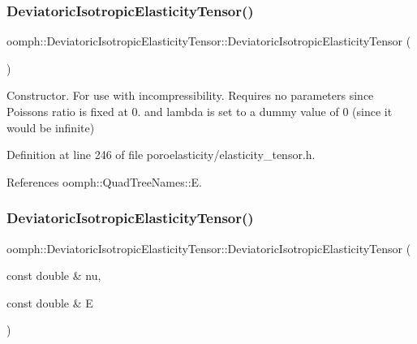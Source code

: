 \subsubsection{\texorpdfstring{Deviatoric\+Isotropic\+Elasticity\+Tensor()}{DeviatoricIsotropicElasticityTensor()}\hspace{0.1cm}{\footnotesize\ttfamily [1/4]}}
{\footnotesize\ttfamily oomph\+::\+Deviatoric\+Isotropic\+Elasticity\+Tensor\+::\+Deviatoric\+Isotropic\+Elasticity\+Tensor (\begin{DoxyParamCaption}{ }\end{DoxyParamCaption})\hspace{0.3cm}{\ttfamily [inline]}}



Constructor. For use with incompressibility. Requires no parameters since Poisson\textquotesingle{}s ratio is fixed at 0. and lambda is set to a dummy value of 0 (since it would be infinite) 



Definition at line 246 of file poroelasticity/elasticity\+\_\+tensor.\+h.



References oomph\+::\+Quad\+Tree\+Names\+::E.

\mbox{\label{classoomph_1_1DeviatoricIsotropicElasticityTensor_a4f3edce9cd91008468599fb24b950707}} 
\subsubsection{\texorpdfstring{Deviatoric\+Isotropic\+Elasticity\+Tensor()}{DeviatoricIsotropicElasticityTensor()}\hspace{0.1cm}{\footnotesize\ttfamily [2/4]}}
{\footnotesize\ttfamily oomph\+::\+Deviatoric\+Isotropic\+Elasticity\+Tensor\+::\+Deviatoric\+Isotropic\+Elasticity\+Tensor (\begin{DoxyParamCaption}\item[{const double \&}]{nu,  }\item[{const double \&}]{E }\end{DoxyParamCaption})\hspace{0.3cm}{\ttfamily [inline]}}



